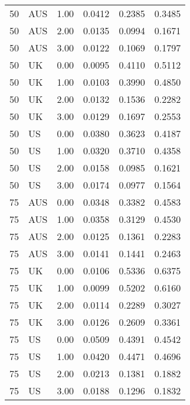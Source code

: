 \begin{table}[ht]
\begin{tabular}{llrlll}
  50 & AUS & 1.00 & 0.0412 & 0.2385 & 0.3485 \\ 
  50 & AUS & 2.00 & 0.0135 & 0.0994 & 0.1671 \\ 
  50 & AUS & 3.00 & 0.0122 & 0.1069 & 0.1797 \\ 
  50 & UK & 0.00 & 0.0095 & 0.4110 & 0.5112 \\ 
  50 & UK & 1.00 & 0.0103 & 0.3990 & 0.4850 \\ 
  50 & UK & 2.00 & 0.0132 & 0.1536 & 0.2282 \\ 
  50 & UK & 3.00 & 0.0129 & 0.1697 & 0.2553 \\ 
  50 & US & 0.00 & 0.0380 & 0.3623 & 0.4187 \\ 
  50 & US & 1.00 & 0.0320 & 0.3710 & 0.4358 \\ 
  50 & US & 2.00 & 0.0158 & 0.0985 & 0.1621 \\ 
  50 & US & 3.00 & 0.0174 & 0.0977 & 0.1564 \\ 
  75 & AUS & 0.00 & 0.0348 & 0.3382 & 0.4583 \\ 
  75 & AUS & 1.00 & 0.0358 & 0.3129 & 0.4530 \\ 
  75 & AUS & 2.00 & 0.0125 & 0.1361 & 0.2283 \\ 
  75 & AUS & 3.00 & 0.0141 & 0.1441 & 0.2463 \\ 
  75 & UK & 0.00 & 0.0106 & 0.5336 & 0.6375 \\ 
  75 & UK & 1.00 & 0.0099 & 0.5202 & 0.6160 \\ 
  75 & UK & 2.00 & 0.0114 & 0.2289 & 0.3027 \\ 
  75 & UK & 3.00 & 0.0126 & 0.2609 & 0.3361 \\ 
  75 & US & 0.00 & 0.0509 & 0.4391 & 0.4542 \\ 
  75 & US & 1.00 & 0.0420 & 0.4471 & 0.4696 \\ 
  75 & US & 2.00 & 0.0213 & 0.1381 & 0.1882 \\ 
  75 & US & 3.00 & 0.0188 & 0.1296 & 0.1832 \\ 
   \hline
\end{tabular}
\end{table}
